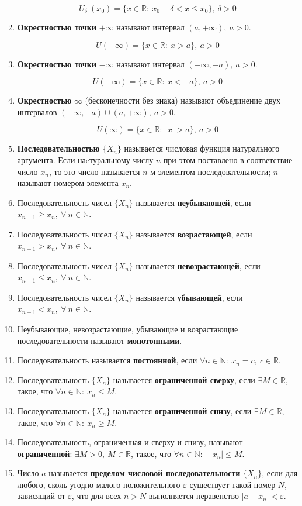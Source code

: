 \begin{enumerate}
$$U^-_{\delta}(x_0) = \{x \in \mathbb{R}: \ x_0 -\delta < x \leqslant x_0\},\ \delta > 0
    $$
\item \textbf{Окрестностью точки} $+\infty$ называют интервал $(a, +\infty), \ a > 0$.

$$U(+\infty) = \{x \in \mathbb{R}: \ x > a\}, \ a > 0
    $$
\item \textbf{Окрестностью точки} $-\infty$ называют интервал $(-\infty, -a), \ a > 0$.

$$U(-\infty) = \{x \in \mathbb{R}: \ x < -a\}, \ a > 0
    $$
\item \textbf{Окрестностью} $\infty$ (бесконечности без знака) называют объединение двух интервалов $(-\infty, -a) \cup (a, +\infty),\ a > 0$.

$$U(\infty) = \{x \in \mathbb{R}: \ | x | > a\}, \ a > 0
    $$
\item \textbf{Последовательностью $\{X_n\}$} называется числовая функция натурального аргумента. Если наeтуральному числу $n$ при этом поставлено в соответствие число $x_n$, то это число называется $n$-м элементом последовательности; $n$ называют номером элемента $x_n$.
\item Последовательность чисел $\{X_n\}$ называется \textbf{неубывающей}, если $x_{n+1}\geqslant x_n, \ \forall\ n \in \mathbb{N}$.
\item Последовательность чисел $\{X_n\}$ называется \textbf{возрастающей}, если $x_{n+1} > x_n, \ \forall\ n \in \mathbb{N}$.
\item Последовательность чисел $\{X_n\}$ называется \textbf{невозрастающей}, если $x_{n+1} \leqslant x_n, \ \forall\ n \in \mathbb{N}$.
\item Последовательность чисел $\{X_n\}$ называется \textbf{убывающей}, если $x_{n+1} < x_n, \ \forall\ n \in \mathbb{N}$.
\item Неубывающие, невозрастающие, убывающие и возрастающие последовательности называют \textbf{монотонными}.
\item Последовательность называется \textbf{постоянной}, если $ \forall n \in \mathbb{N}: \ x_n = c, \ c \in \mathbb{R}$.
\item Последовательность $\{X_n\}$ называется \textbf{ограниченной сверху}, если $\exists M \in \mathbb{R}$, такое, что $\forall n \in \mathbb{N}: \ x_n \leqslant M$.
\item Последовательность $\{X_n\}$ называется \textbf{ограниченной снизу}, если $\exists M \in \mathbb{R}$, такое, что $\forall n \in \mathbb{N}: \ x_n \geqslant M$.
\item Последовательность, ограниченная и сверху и снизу, называют \textbf{ограниченной}: $\exists M > 0, \ M \in \mathbb{R}$, такое, что $\forall n \in \mathbb{N}: \ \mid  x_n\mid   \leqslant M$.
\item Число $a$ называется \textbf{пределом числовой последовательности} $\{X_n\}$, если для любого, сколь угодно малого положительного ${\varepsilon}$ существует такой номер $N$, зависящий от ${\varepsilon}$, что для всех $n > N$ выполняется неравенство $\mid  a - x_n\mid   < {\varepsilon}$.


\end{enumerate}
